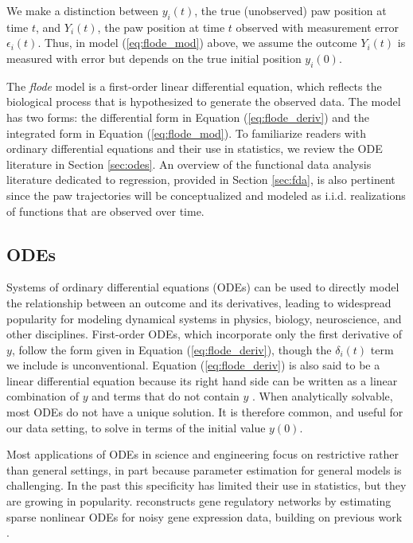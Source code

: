 \documentclass[preprint]{JASA}
\begin{document}
\noindent We make a distinction between \(y_i(t)\), the true
(unobserved) paw position at time \(t\), and \(Y_i(t)\), the paw
position at time \(t\) observed with measurement error
\(\epsilon_i(t)\). Thus, in model (\ref{eq:flode_mod}) above, we assume
the outcome \(Y_i(t)\) is measured with error but depends on the true
initial position \(y_i(0)\).

The \emph{flode} model is a first-order linear differential equation,
which reflects the biological process that is hypothesized to generate
the observed data. The model has two forms: the differential form in
Equation (\ref{eq:flode_deriv}) and the integrated form in Equation
(\ref{eq:flode_mod}). To familiarize readers with ordinary differential
equations and their use in statistics, we review the ODE literature in
Section \ref{sec:odes}. An overview of the functional data analysis
literature dedicated to regression, provided in Section \ref{sec:fda},
is also pertinent since the paw trajectories will be conceptualized and
modeled as i.i.d. realizations of functions that are observed over time.

\hypertarget{odes}{%
\subsection{ODEs}\label{odes}}

\label{sec:odes}

Systems of ordinary differential equations (ODEs) can be used to
directly model the relationship between an outcome and its derivatives,
leading to widespread popularity for modeling dynamical systems in
physics, biology, neuroscience, and other disciplines. First-order ODEs,
which incorporate only the first derivative of \(y\), follow the form
given in Equation (\ref{eq:flode_deriv}), though the \(\delta_i(t)\)
term we include is unconventional. Equation (\ref{eq:flode_deriv}) is
also said to be a linear differential equation because its right hand
side can be written as a linear combination of \(y\) and terms that do
not contain \(y\) \citep{tennenbaum1985}. When analytically solvable,
most ODEs do not have a unique solution. It is therefore common, and
useful for our data setting, to solve in terms of the initial value
\(y(0)\).

Most applications of ODEs in science and engineering focus on
restrictive rather than general settings, in part because parameter
estimation for general models is challenging. In the past this
specificity has limited their use in statistics, but they are growing in
popularity. \cite{chen2017} reconstructs gene regulatory networks by
estimating sparse nonlinear ODEs for noisy gene expression data,
building on previous work \citep{lu2011, henderson2014}.
\end{document}

